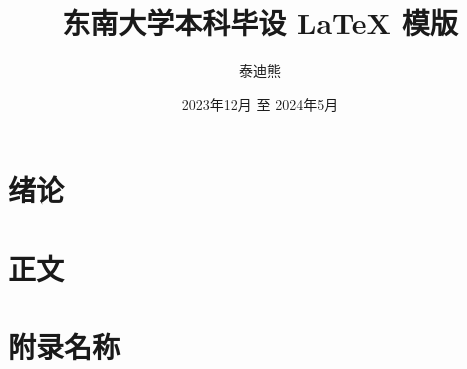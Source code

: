 \documentclass[fontset = mac ms]{seuthesis2024b} %
\title{东南大学本科毕设 \LaTeX{} 模版}
\author{泰迪熊}
\date{2023年12月 至 2024年5月}
\begin{document}
  \maketitle

  \chapter{绪论}\label{chap:introduction}
  
    
  \chapter{正文}\label{chap:body}
  


  \chapterBib\label{chap:bib}

  \appendix
  \chapter{附录名称}\label{chap:appendix}
  
  
  \chapterAck
  
\end{document}
